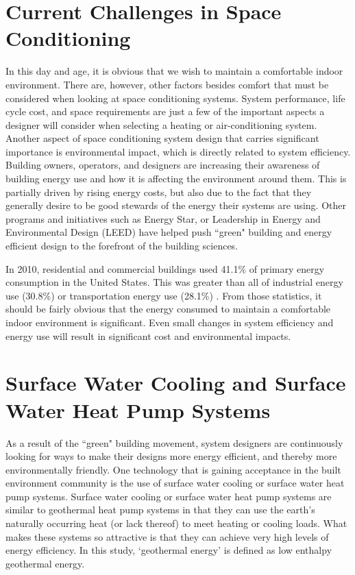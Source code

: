 	\section{Current Challenges in Space Conditioning}
	\label{sec:Intro:Background:CurChallenges}

In this day and age, it is obvious that we wish to maintain a comfortable indoor environment. There are, however, other factors besides comfort that must be considered when looking at space conditioning systems. System performance, life cycle cost, and space requirements are just a few of the important aspects a designer will consider when selecting a heating or air-conditioning system. Another aspect of space conditioning system design that carries significant importance is environmental impact, which is directly related to system efficiency. Building owners, operators, and designers are increasing their awareness of building energy use and how it is affecting the environment around them. This is partially driven by rising energy costs, but also due to the fact that they generally desire to be good stewards of the energy their systems are using. Other programs and initiatives such as Energy Star, or Leadership in Energy and Environmental Design (LEED) have helped push ``green" building and energy efficient design to the forefront of the building sciences.

In 2010, residential and commercial buildings used 41.1\% of primary energy consumption in the United States. This was greater than all of industrial energy use (30.8\%) or transportation energy use (28.1\%) \citep{DOE2010}. From those statistics, it should be fairly obvious that the energy consumed to maintain a comfortable indoor environment is significant. Even small changes in system efficiency and energy use will result in significant cost and environmental impacts.

\section{Surface Water Cooling and Surface Water Heat Pump Systems}
\label{sec:Intro:SystemOverview}

As a result of the ``green" building movement, system designers are continuously looking for ways to make their designs more energy efficient, and thereby more environmentally friendly. One technology that is gaining acceptance in the built environment community is the use of surface water cooling or surface water heat pump systems. Surface water cooling or surface water heat pump systems are similar to geothermal heat pump systems in that they can use the earth's naturally occurring heat (or lack thereof) to meet heating or cooling loads. What makes these systems so attractive is that they can achieve very high levels of energy efficiency. In this study, `geothermal energy' is defined as low enthalpy geothermal energy.

